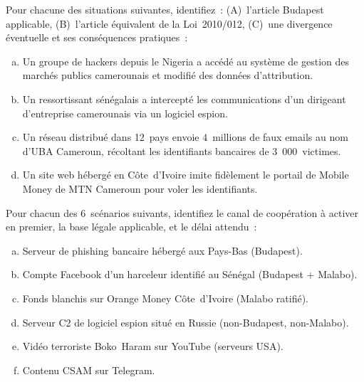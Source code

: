 \bigskip

\begin{boxexo}[title={\ding{45}\quad Exercice~10.1 --- Qualification internationale \niveaubase}]
Pour chacune des situations suivantes, identifiez~: (A)~l'article Budapest
applicable, (B)~l'article équivalent de la Loi~2010/012, (C)~une divergence
éventuelle et ses conséquences pratiques~:
\begin{enumerate}[(a)]
    \item Un groupe de hackers depuis le Nigeria a accédé au système de
          gestion des marchés publics camerounais et modifié des données
          d'attribution.
    \item Un ressortissant sénégalais a intercepté les communications
          d'un dirigeant d'entreprise camerounais via un logiciel espion.
    \item Un réseau distribué dans 12~pays envoie 4~millions de faux
          emails au nom d'UBA Cameroun, récoltant les identifiants
          bancaires de 3~000~victimes.
    \item Un site web hébergé en Côte~d'Ivoire imite fidèlement le portail
          de Mobile Money de MTN Cameroun pour voler les identifiants.
\end{enumerate}
\end{boxexo}

\begin{boxexo}[title={\ding{45}\quad Exercice~10.2 --- Choix de canal \niveaumoyen}]
Pour chacun des 6~scénarios suivants, identifiez le canal de coopération
à activer en premier, la base légale applicable, et le délai attendu~:
\begin{enumerate}[(a)]
    \item Serveur de phishing bancaire hébergé aux Pays-Bas (Budapest).
    \item Compte Facebook d'un harceleur identifié au Sénégal
          (Budapest + Malabo).
    \item Fonds blanchis sur Orange Money Côte~d'Ivoire (Malabo ratifié).
    \item Serveur C2 de logiciel espion situé en Russie
          (non-Budapest, non-Malabo).
    \item Vidéo terroriste Boko~Haram sur YouTube (serveurs USA).
    \item Contenu CSAM sur Telegram.
\end{enumerate}
\end{boxexo}

